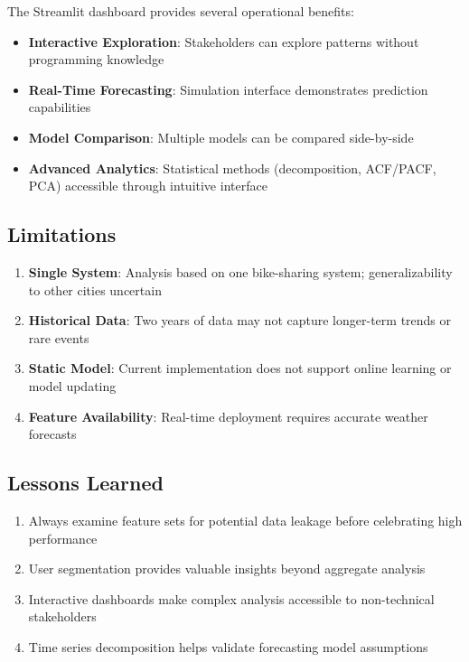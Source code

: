 \documentclass[12pt,a4paper]{article}
\begin{document}
The Streamlit dashboard provides several operational benefits:
\begin{itemize}
    \item \textbf{Interactive Exploration}: Stakeholders can explore patterns without programming knowledge
    \item \textbf{Real-Time Forecasting}: Simulation interface demonstrates prediction capabilities
    \item \textbf{Model Comparison}: Multiple models can be compared side-by-side
    \item \textbf{Advanced Analytics}: Statistical methods (decomposition, ACF/PACF, PCA) accessible through intuitive interface
\end{itemize}

\subsection{Limitations}

\begin{enumerate}
    \item \textbf{Single System}: Analysis based on one bike-sharing system; generalizability to other cities uncertain
    \item \textbf{Historical Data}: Two years of data may not capture longer-term trends or rare events
    \item \textbf{Static Model}: Current implementation does not support online learning or model updating
    \item \textbf{Feature Availability}: Real-time deployment requires accurate weather forecasts
\end{enumerate}

\subsection{Lessons Learned}

\begin{enumerate}
    \item Always examine feature sets for potential data leakage before celebrating high performance
    \item User segmentation provides valuable insights beyond aggregate analysis
    \item Interactive dashboards make complex analysis accessible to non-technical stakeholders
    \item Time series decomposition helps validate forecasting model assumptions
\end{enumerate}
\end{document}
